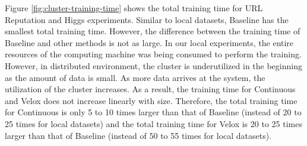 \documentclass{vldb}
\begin{document}
Figure \ref{fig:cluster-training-time} shows the total training time for URL Reputation and Higgs experiments.
Similar to local datasets, Baseline has the smallest total training time.
However, the difference between the training time of Baseline and other methods is not as large.
In our local experiments, the entire resources of the computing machine was being consumed to perform the training.
However, in distributed environment, the cluster is underutilized in the beginning as the amount of data is small.
As more data arrives at the system, the utilization of the cluster increases.
As a result, the training time for Continuous and Velox does not increase linearly with size.
Therefore, the total training time for Continuous is only 5 to 10 times larger than that of Baseline (instead of 20 to 25 times for local datasets) and the total training time for Velox is 20 to 25 times larger than that of Baseline (instead of 50 to 55 times for local datasets).
\end{document}
